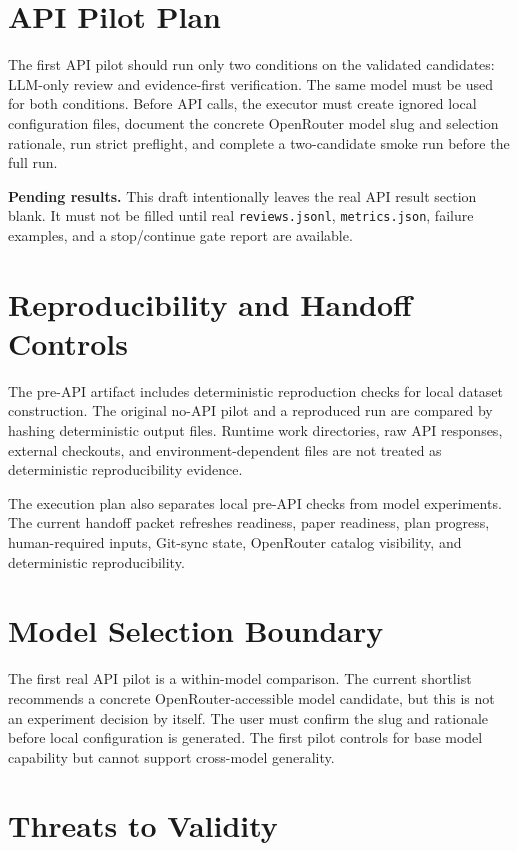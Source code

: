 \documentclass[conference]{IEEEtran}
\begin{document}
\section{API Pilot Plan}

The first API pilot should run only two conditions on the validated candidates:
LLM-only review and evidence-first verification. The same model must be used
for both conditions. Before API calls, the executor must create ignored local
configuration files, document the concrete OpenRouter model slug and selection
rationale, run strict preflight, and complete a two-candidate smoke run before
the full run.

\textbf{Pending results.} This draft intentionally leaves the real API result
section blank. It must not be filled until real \texttt{reviews.jsonl},
\texttt{metrics.json}, failure examples, and a stop/continue gate report are
available.

\section{Reproducibility and Handoff Controls}

The pre-API artifact includes deterministic reproduction checks for local
dataset construction. The original no-API pilot and a reproduced run are
compared by hashing deterministic output files. Runtime work directories, raw
API responses, external checkouts, and environment-dependent files are not
treated as deterministic reproducibility evidence.

The execution plan also separates local pre-API checks from model experiments.
The current handoff packet refreshes readiness, paper readiness, plan progress,
human-required inputs, Git-sync state, OpenRouter catalog visibility, and
deterministic reproducibility.

\section{Model Selection Boundary}

The first real API pilot is a within-model comparison. The current shortlist
recommends a concrete OpenRouter-accessible model candidate, but this is not an
experiment decision by itself. The user must confirm the slug and rationale
before local configuration is generated. The first pilot controls for base
model capability but cannot support cross-model generality.

\section{Threats to Validity}
\end{document}
